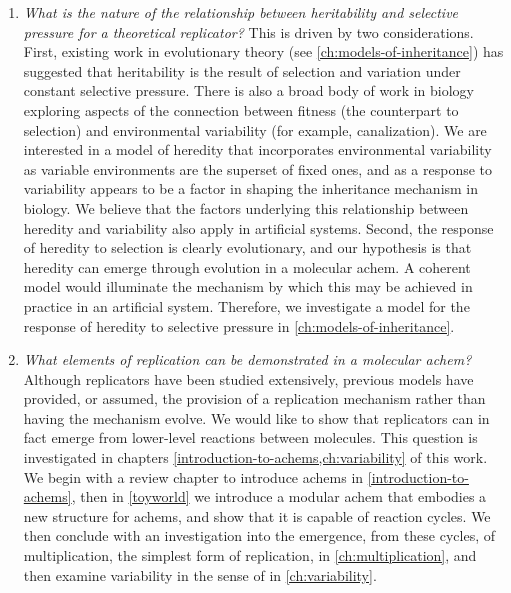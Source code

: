 \begin{enumerate}[label=RQ\arabic*:]
	
	\item \emph{What is the nature of the relationship between heritability and selective pressure for a theoretical replicator?} This is driven by two considerations. First, existing work in evolutionary theory (see \cref{ch:models-of-inheritance}) has suggested that heritability is the result of selection and variation under constant selective pressure. There is also a broad body of work in biology exploring aspects of the connection between fitness (the counterpart to selection) and environmental variability (for example, canalization). We are interested in a model of heredity that incorporates environmental variability as variable environments are the superset of fixed ones, and as a response to variability appears to be a factor in shaping the inheritance mechanism in biology. We believe that the factors underlying this relationship between heredity and variability also apply in artificial systems. Second, the response of heredity to selection is clearly evolutionary, and our hypothesis is that heredity can emerge through evolution in a molecular \gls{achem}. A coherent model would illuminate the mechanism by which this may be achieved in practice in an artificial system. Therefore, we investigate a model for the response of heredity to selective pressure in \cref{ch:models-of-inheritance}.
	
	\item \emph{What elements of replication can be demonstrated in a molecular \gls{achem}?} Although replicators have been studied extensively, previous models have provided, or assumed, the provision of a replication mechanism rather than having the mechanism evolve. We would like to show that replicators can in fact emerge from lower-level reactions between molecules. This question is investigated in chapters \cref{introduction-to-achems,ch:variability} of this work. We begin with a review chapter to introduce \glspl{achem} in \cref{introduction-to-achems}, then in \cref{toyworld} we introduce a modular \gls{achem} that embodies a new structure for \glspl{achem}, and show that it is capable of reaction cycles. We then conclude with an investigation into the emergence, from these cycles, of multiplication, the simplest form of replication, in \cref{ch:multiplication}, and then examine variability in the sense of \textcite{Zachar2010} in \cref{ch:variability}.

\end{enumerate}

